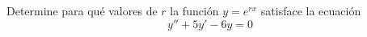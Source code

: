 \item Determine para qué valores de $r$ la función $y = e^{rx}$ satisface la ecuación
$$y'' + 5y' - 6y = 0$$
